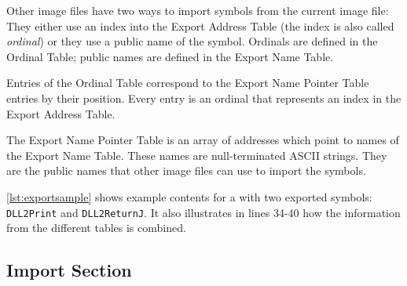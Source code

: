 Other image files have two ways to import symbols from the current image file: They either use an index into the Export Address Table (the index is also called \emph{ordinal}) or they use a public name of the symbol. Ordinals are defined in the Ordinal Table; public names are defined in the Export Name Table.

Entries of the Ordinal Table correspond to the Export Name Pointer Table entries by their position. Every entry is an ordinal that represents an index in the Export Address Table.

The Export Name Pointer Table is an array of addresses which point to names of the Export Name Table. These names are null-terminated ASCII strings. They are the public names that other image files can use to import the symbols.

\autoref{lst:exportsample} shows example contents for a \DLL{} with two exported symbols: \texttt{DLL2Print} and \texttt{DLL2ReturnJ}. It also illustrates in lines 34-40 how the information from the different tables is combined.



\subsection*{Import Section}


